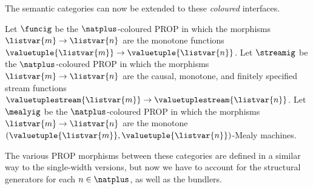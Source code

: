 \documentclass{lmcs}
\begin{document}
The semantic categories can now be extended to these \emph{coloured} interfaces.

\begin{defi}
    Let \(\funcig\) be the \(\natplus\)-coloured PROP in which the morphisms
    \(\listvar{m} \to \listvar{n}\) are the monotone functions
    \(\valuetuple{\listvar{m}} \to \valuetuple{\listvar{n}}\).
    Let \(\streamig\) be the \(\natplus\)-coloured PROP in which the morphisms
    \(\listvar{m} \to \listvar{n}\) are the causal, monotone, and finitely
    specified stream functions \(
    \valuetuplestream{\listvar{m}} \to \valuetuplestream{\listvar{n}}
    \).
    Let \(\mealyig\) be the \(\natplus\)-coloured PROP in which the morphisms
    \(\listvar{m} \to \listvar{n}\) are the monotone
    \((\valuetuple{\listvar{m}}, \valuetuple{\listvar{n}})\)-Mealy machines.
\end{defi}

The various PROP morphisms between these categories are defined in a similar way
to the single-width versions, but now we have to account for the structural
generators for each \(n \in \natplus\), as well as the bundlers.
\end{document}
